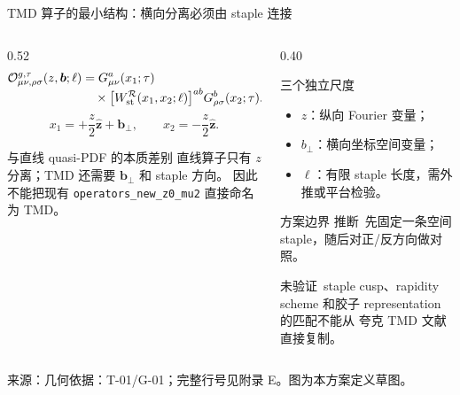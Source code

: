 \documentclass[UTF8,aspectratio=169,11pt]{ctexbeamer}
\newcommand{\source}[1]{%
  \par\vspace{0.05em}%
  {\raggedright\scriptsize\color{muted}来源：#1\par}}
\newcommand{\inferred}{\textcolor{accent}{推断}}
\newcommand{\unverified}{\textcolor{warning}{未验证}}
\begin{document}
\begin{frame}[t]{TMD 算子的最小结构：横向分离必须由 staple 连接}
  \begin{columns}[T,totalwidth=\textwidth]
    \begin{column}{0.52\textwidth}
      \begin{equation*}
        \begin{aligned}
        \mathcal O^{g,\tau}_{\mu\nu,\rho\sigma}(z,\boldsymbol b;\ell)
        &=G^a_{\mu\nu}(x_1;\tau)\\[-0.25em]
        &\quad\times
        \big[W_{\rm st}^{\mathcal R}(x_1,x_2;\ell)\big]^{ab}
        G^b_{\rho\sigma}(x_2;\tau).
        \end{aligned}
        \tag{1}
      \end{equation*}
      \[
        x_1=+\frac z2\hat{\boldsymbol z}+\boldsymbol b_\perp,
        \qquad
        x_2=-\frac z2\hat{\boldsymbol z}.
      \]
      \begin{block}{与直线 quasi-PDF 的本质差别}
        直线算子只有 $z$ 分离；TMD 还需要 $\boldsymbol b_\perp$ 和 staple 方向。
        因此不能把现有 \texttt{operators\_new\_z0\_mu2} 直接命名为 TMD。
      \end{block}
    \end{column}
    \begin{column}{0.40\textwidth}
      \begin{block}{三个独立尺度}
        \begin{itemize}
          \item $z$：纵向 Fourier 变量；
          \item $b_\perp$：横向坐标空间变量；
          \item $\ell$：有限 staple 长度，需外推或平台检验。
        \end{itemize}
      \end{block}
      \begin{block}{方案边界}
        \inferred\ 先固定一条空间 staple，随后对正/反方向做对照。

        \unverified\ staple cusp、rapidity scheme 和胶子 representation 的匹配不能从
        夸克 TMD 文献直接复制。
      \end{block}
    \end{column}
  \end{columns}
  \source{几何依据：T-01/G-01；完整行号见附录 E。图为本方案定义草图。}
\end{frame}
\end{document}
